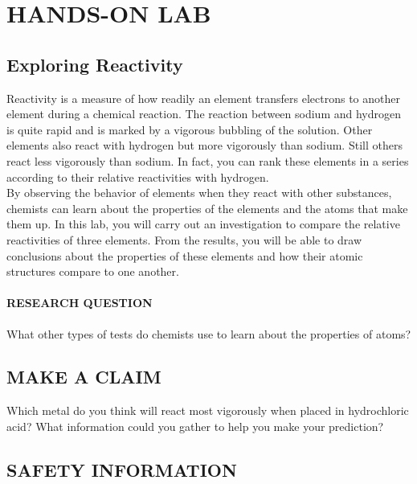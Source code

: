 \documentclass[a4paper,12pt]{exam}
\begin{document}
\section*{HANDS-ON LAB}

\subsection*{Exploring Reactivity}

Reactivity is a measure of how readily an element transfers electrons to
another element during a chemical reaction. The reaction between sodium
and hydrogen is quite rapid and is marked by a vigorous bubbling of the
solution. Other elements also react with hydrogen but more vigorously than
sodium. Still others react less vigorously than sodium. In fact, you can rank
these elements in a series according to their relative reactivities with
hydrogen.\\

By observing the behavior of elements when they react with other
substances, chemists can learn about the properties of the elements and
the atoms that make them up. In this lab, you will carry out an investigation
to compare the relative reactivities of three elements. From the results, you
will be able to draw conclusions about the properties of these elements and
how their atomic structures compare to one another.\\

\paragraph{RESEARCH QUESTION} What other types of tests do chemists use to
learn about the properties of atoms?

\subsection*{MAKE A CLAIM}

Which metal do you think will react most vigorously when placed in
hydrochloric acid? What information could you gather to help you make
your prediction?

\subsection*{SAFETY INFORMATION}
\end{document}
